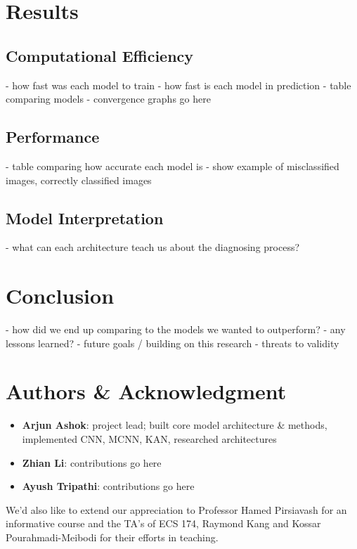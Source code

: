\documentclass[conference]{IEEEtran}
\begin{document}
\section{Results}
\subsection{Computational Efficiency}
- how fast was each model to train
- how fast is each model in prediction
- table comparing models
- convergence graphs go here

\subsection{Performance}
- table comparing how accurate each model is
- show example of misclassified images, correctly classified images

\subsection{Model Interpretation}
- what can each architecture teach us about the diagnosing process?


\section{Conclusion}
- how did we end up comparing to the models we wanted to outperform?
- any lessons learned?
- future goals / building on this research
- threats to validity


\section{Authors \& Acknowledgment}
\begin{itemize}
    \item \textbf{Arjun Ashok}: project lead; built core model architecture \& methods, implemented CNN, MCNN, KAN, researched architectures%
    \item \textbf{Zhian Li}: contributions go here
    \item \textbf{Ayush Tripathi}: contributions go here
\end{itemize}

We'd also like to extend our appreciation to Professor Hamed Pirsiavash for an informative course and the TA's of ECS 174, Raymond Kang and Kossar Pourahmadi-Meibodi for their efforts in teaching.




\end{document}
